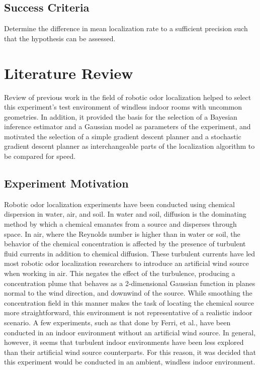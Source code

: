 \documentclass[submit, 12pt]{aiaa-pretty-modified}
\begin{document}
\subsection*{Success Criteria} 
Determine the difference in mean localization rate to a sufficient precision such that the hypothesis can be assessed.

\section{Literature Review}
\label{sec:lit-review}
Review of previous work in the field of robotic odor localization helped to select
this experiment's test environment of windless indoor rooms with uncommon
geometries. In addition, it provided the basis for the selection of a Bayesian inference
estimator and a Gaussian model as parameters of the experiment, and
motivated the selection of a simple gradient descent planner and a stochastic
gradient descent planner as interchangeable parts of the localization algorithm
to be compared for speed.

\subsection{Experiment Motivation}
Robotic odor localization experiments have been conducted using chemical
dispersion in water, air, and soil.\cite{kowadlo} In water and soil, diffusion is the
dominating method by which a chemical emanates from a source and disperses
through space. In air, where the Reynolds number is higher than in water or
soil, the behavior of the chemical concentration is affected by the presence of
turbulent fluid currents in addition to chemical diffusion.\cite{kowadlo} These turbulent
currents have led most robotic odor localization researchers to introduce an
artificial wind source when working in air. This negates the effect of the
turbulence, producing a concentration plume that behaves as a 2-dimensional
Gaussian function in planes normal to the wind direction, and downwind of the
source. \cite{ferri} While smoothing the concentration field in this manner makes the task of locating the
chemical source more straightforward, this environment is not representative of
a realistic indoor scenario. A few experiments, such as that done by Ferri, et
al., have been conducted in an indoor environment without an artificial wind
source. \cite{ferri} In general, however, it seems that turbulent indoor environments
have been less explored than their artificial wind source counterparts. For this
reason, it was decided that this experiment would be conducted in an ambient,
windless indoor environment.
\end{document}

